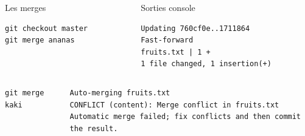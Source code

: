 \documentclass[table,tikz,12pt,svgnames]{beamer}
\begin{document}
\begin{frame}[fragile]
\PAUSE

\begin{adjustwidth}{0.4cm}{-1cm}{}
	\vspace{-0.48em}
	\begin{columns}[T] %
		\begin{column}{.45\textwidth}
\color{darkgreen}%
Les merges
\color{black}
\begin{verbatim}
git checkout master
git merge ananas
\end{verbatim}
\end{column}%
\hfill%
\begin{column}{.6\textwidth}

\color{darkgreen}%
Sorties console
\color{black}
\vspace{-1em}
\begin{verbatim}
Updating 760cf0e..1711864
Fast-forward
fruits.txt | 1 +
1 file changed, 1 insertion(+)
\end{verbatim}
\end{column}%
\end{columns}

\begin{columns}[T] %
	\hspace{0.3cm}
	\begin{column}{.3\textwidth}
		\color{darkgreen}%
		\color{black}
		\begin{verbatim}
git merge kaki
		\end{verbatim}
		
	\end{column}%
	\hspace{-0.4cm}
	\begin{column}{.9\textwidth}
		
	\color{darkgreen}%
	\color{black}
	\vspace{-0.2em}
	\begin{verbatim}
Auto-merging fruits.txt
CONFLICT (content): Merge conflict in fruits.txt
Automatic merge failed; fix conflicts and then commit the result.
		\end{verbatim}
	\end{column}%
\end{columns}
\end{adjustwidth}
\end{frame}
\end{document}
